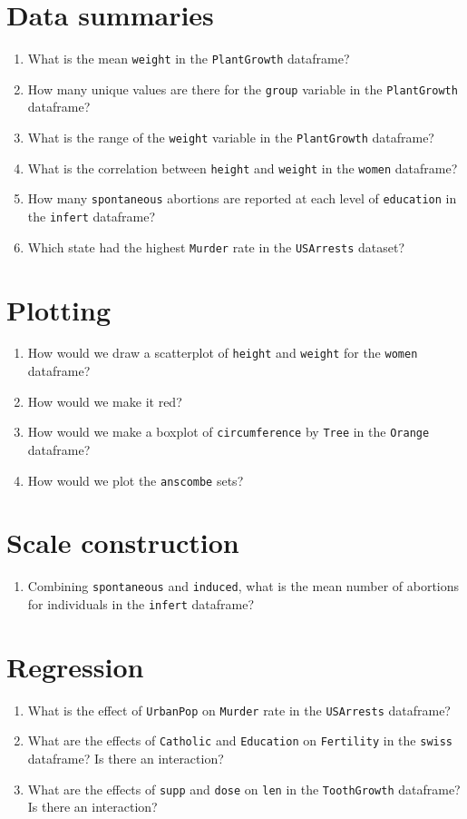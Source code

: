 \documentclass[12pt,a4paper]{article}
\begin{document}
\section*{Data summaries}
\begin{enumerate}
\item What is the mean \texttt{weight} in the \texttt{PlantGrowth} dataframe?
\item How many unique values are there for the \texttt{group} variable in the \texttt{PlantGrowth} dataframe?
\item What is the range of the \texttt{weight} variable in the \texttt{PlantGrowth} dataframe?
\item What is the correlation between \texttt{height} and \texttt{weight} in the \texttt{women} dataframe?
\item How many \texttt{spontaneous} abortions are reported at each level of \texttt{education} in the \texttt{infert} dataframe?
\item Which state had the highest \texttt{Murder} rate in the \texttt{USArrests} dataset?
\end{enumerate}

\section*{Plotting}
\begin{enumerate}
\item How would we draw a scatterplot of \texttt{height} and \texttt{weight} for the \texttt{women} dataframe?
\item How would we make it red?
\item How would we make a boxplot of \texttt{circumference} by \texttt{Tree} in the \texttt{Orange} dataframe?
\item How would we plot the \texttt{anscombe} sets?
\end{enumerate}


\section*{Scale construction}
\begin{enumerate}
\item Combining \texttt{spontaneous} and \texttt{induced}, what is the mean number of abortions for individuals in the \texttt{infert} dataframe?
\end{enumerate}


\section*{Regression}
\begin{enumerate}
\item What is the effect of \texttt{UrbanPop} on \texttt{Murder} rate in the \texttt{USArrests} dataframe?
\item What are the effects of \texttt{Catholic} and \texttt{Education} on \texttt{Fertility} in the \texttt{swiss} dataframe? Is there an interaction?
\item What are the effects of \texttt{supp} and \texttt{dose} on \texttt{len} in the \texttt{ToothGrowth} dataframe? Is there an interaction?
\end{enumerate}
\end{document}
